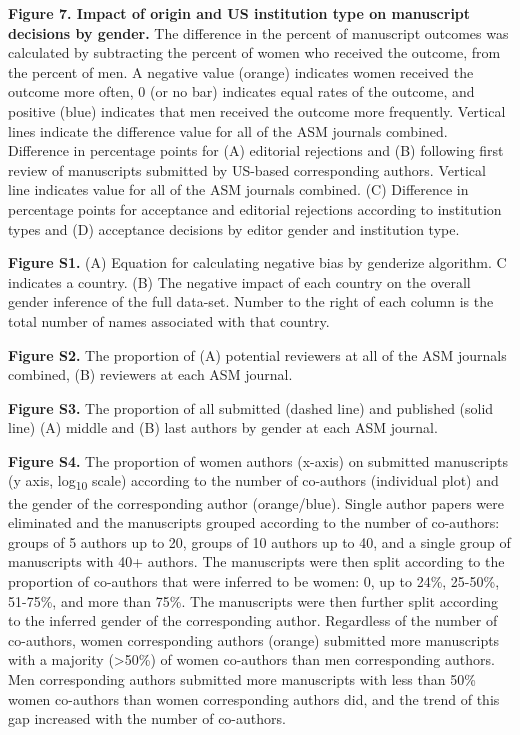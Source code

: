 \documentclass[11pt,]{article}
\begin{document}
\textbf{Figure 7. Impact of origin and US institution type on manuscript
decisions by gender.} The difference in the percent of manuscript
outcomes was calculated by subtracting the percent of women who received
the outcome, from the percent of men. A negative value (orange)
indicates women received the outcome more often, 0 (or no bar) indicates
equal rates of the outcome, and positive (blue) indicates that men
received the outcome more frequently. Vertical lines indicate the
difference value for all of the ASM journals combined. Difference in
percentage points for (A) editorial rejections and (B) following first
review of manuscripts submitted by US-based corresponding authors.
Vertical line indicates value for all of the ASM journals combined. (C)
Difference in percentage points for acceptance and editorial rejections
according to institution types and (D) acceptance decisions by editor
gender and institution type.

\textbf{Figure S1.} (A) Equation for calculating negative bias by
genderize algorithm. C indicates a country. (B) The negative impact of
each country on the overall gender inference of the full data-set.
Number to the right of each column is the total number of names
associated with that country.

\textbf{Figure S2.} The proportion of (A) potential reviewers at all of
the ASM journals combined, (B) reviewers at each ASM journal.

\textbf{Figure S3.} The proportion of all submitted (dashed line) and
published (solid line) (A) middle and (B) last authors by gender at each
ASM journal.

\textbf{Figure S4.} The proportion of women authors (x-axis) on
submitted manuscripts (y axis, log\textsubscript{10} scale) according to
the number of co-authors (individual plot) and the gender of the
corresponding author (orange/blue). Single author papers were eliminated
and the manuscripts grouped according to the number of co-authors:
groups of 5 authors up to 20, groups of 10 authors up to 40, and a
single group of manuscripts with 40+ authors. The manuscripts were then
split according to the proportion of co-authors that were inferred to be
women: 0, up to 24\%, 25-50\%, 51-75\%, and more than 75\%. The
manuscripts were then further split according to the inferred gender of
the corresponding author. Regardless of the number of co-authors, women
corresponding authors (orange) submitted more manuscripts with a
majority (\textgreater50\%) of women co-authors than men corresponding
authors. Men corresponding authors submitted more manuscripts with less
than 50\% women co-authors than women corresponding authors did, and the
trend of this gap increased with the number of co-authors.
\end{document}

